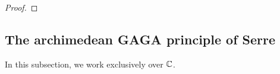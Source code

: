         \begin{theorem} \label{theorem: zariski_main_theorem}
            
        \end{theorem}
            \begin{proof}
                
            \end{proof}

        \begin{theorem} \label{theorem: stein_factorisation}
            
        \end{theorem}

    \subsection{The archimedean GAGA principle of Serre}
        \begin{convention}
            In this subsection, we work exclusively over $\mathbb{C}$. 
        \end{convention}

